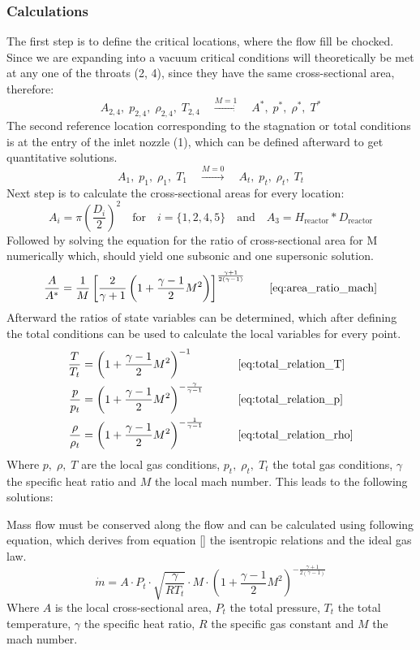\subsubsection*{Calculations}
The first step is to define the critical locations, where the flow fill be chocked.
Since we are expanding into a vacuum critical conditions will theoretically be met at any one of the throats (2, 4), since they have the same cross-sectional area, therefore:
$$
	A_{2,4},\;p_{2,4},\;\rho_{2,4},\;T_{2,4}\quad\xrightarrow{M=1}\quad A^*,\;p^*,\;\rho^*,\;T^*
$$
The second reference location corresponding to the stagnation or total conditions is at the entry of the inlet nozzle (1), which can be defined afterward to get quantitative solutions.
$$
	A_1,\;p_1,\;\rho_1,\;T_1\quad\xrightarrow{M=0}\quad A_t,\;p_t,\;\rho_t,\;T_t
$$
Next step is to calculate the cross-sectional areas for every location:
$$
	A_i = \pi \left(\frac{D_i}{2}\right)^2
		\quad \text{for} \quad
	i=\{1,2,4,5\}
		\quad \text{and} \quad
	A_3 = H_\text{reactor}*D_\text{reactor}
$$
Followed by solving the equation for the ratio of cross-sectional area for M numerically which, should yield one subsonic and one supersonic solution.
$$
	\frac{A}{A^*} = \frac{1}{M} \left[ \frac{2}{\gamma + 1} \left( 1 + \frac{\gamma - 1}{2} M^2 \right) \right]^{\frac{\gamma + 1}{2(\gamma - 1)}}
	\qquad \eqref{eq:area_ratio_mach}
$$
Afterward the ratios of state variables can be determined, which after defining the total conditions can be used to calculate the local variables for every point.
\cite{hall_isentropic_nodate}
\begin{alignat*}{2}
    \frac{T}{T_t}   & = \left( 1 + \frac{\gamma - 1}{2} M^2 \right)^{-1}
    & \qquad & \eqref{eq:total_relation_T} \\
    \frac{p}{p_t}   & = \left( 1 + \frac{\gamma - 1}{2} M^2 \right)^{-\frac{\gamma}{\gamma - 1}}
    & \qquad & \eqref{eq:total_relation_p} \\
    \frac{\rho}{\rho_t} & = \left( 1 + \frac{\gamma - 1}{2} M^2 \right)^{-\frac{1}{\gamma - 1}}
    & \qquad & \eqref{eq:total_relation_rho}
\end{alignat*}
Where $p,\; \rho,\; T$ are the local gas conditions, $p_t,\; \rho_t,\; T_t$ the total gas conditions, $\gamma$ the specific heat ratio and $M$ the local mach number.
This leads to the following solutions:

Mass flow must be conserved along the flow and can be calculated using following equation, which derives from equation \eqref{} the isentropic relations and the ideal gas law.
\cite{benson_mass_nodate}
$$
	\dot{m} = A \cdot P_t \cdot \sqrt{\frac{\gamma}{R T_t}} \cdot M \cdot \left(1 + \frac{\gamma - 1}{2} M^2\right)^{-\frac{\gamma + 1}{2(\gamma - 1)}}
$$
Where $A$ is the local cross-sectional area, $P_t$ the total pressure, $T_t$ the total temperature, $\gamma$ the specific heat ratio, $R$ the specific gas constant and $M$ the mach number.
